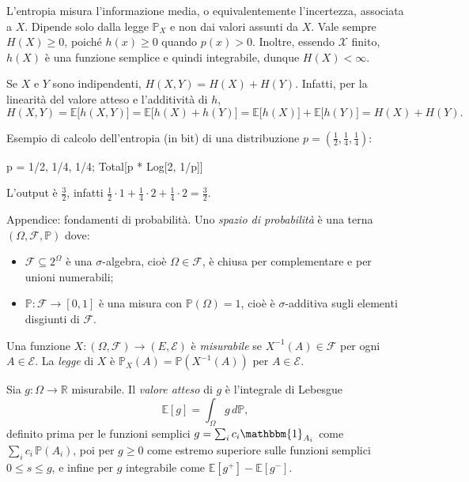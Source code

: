 \begin{rema}
L'entropia misura l'informazione media, o equivalentemente l'incertezza, associata a $X$. Dipende solo dalla legge $\mathbb{P}_X$ e non dai valori assunti da $X$. Vale sempre $H(X)\ge 0$, poiché $h(x)\ge 0$ quando $p(x)>0$. Inoltre, essendo $\mathcal{X}$ finito, $h(X)$ è una funzione semplice e quindi integrabile, dunque $H(X)<\infty$.
\end{rema}
\begin{rema}
Se $X$ e $Y$ sono indipendenti, $H(X,Y)=H(X)+H(Y)$. Infatti, per la linearità del valore atteso e l'additività di $h$,
\[
H(X,Y) = \mathbb{E}\big[h(X,Y)\big] = \mathbb{E}\big[h(X)+h(Y)\big] = \mathbb{E}\big[h(X)\big] + \mathbb{E}\big[h(Y)\big] = H(X) + H(Y).
\]
\end{rema}
\begin{rema}
Esempio di calcolo dell'entropia (in bit) di una distribuzione $p=(\tfrac12,\tfrac14,\tfrac14)$:
\begin{walfram}
p = {1/2, 1/4, 1/4};
Total[p * Log[2, 1/p]]
\end{walfram}
L'output è $\tfrac{3}{2}$, infatti $\tfrac12\cdot 1+\tfrac14\cdot 2+\tfrac14\cdot 2=\tfrac32$.
\end{rema}
\begin{defi}
Appendice: fondamenti di probabilità. Uno \textit{spazio di probabilità} è una terna $(\Omega,\mathcal{F},\mathbb{P})$ dove:
\begin{itemize}
\item $\mathcal{F}\subseteq 2^{\Omega}$ è una $\sigma$-algebra, cioè $\Omega\in\mathcal{F}$, è chiusa per complementare e per unioni numerabili;
\item $\mathbb{P}\colon\mathcal{F}\to[0,1]$ è una misura con $\mathbb{P}(\Omega)=1$, cioè è $\sigma$-additiva sugli elementi disgiunti di $\mathcal{F}$.
\end{itemize}
Una funzione $X\colon(\Omega,\mathcal{F})\to(E,\mathcal{E})$ è \textit{misurabile} se $X^{-1}(A)\in\mathcal{F}$ per ogni $A\in\mathcal{E}$. La \textit{legge} di $X$ è $\mathbb{P}_X(A)=\mathbb{P}(X^{-1}(A))$ per $A\in\mathcal{E}$.
\end{defi}
\begin{defi}
Sia $g\colon\Omega\to\mathbb{R}$ misurabile. Il \textit{valore atteso} di $g$ è l'integrale di Lebesgue
\[
\mathbb{E}[g] = \int_{\Omega} g\, d\mathbb{P},
\]
definito prima per le funzioni semplici $g=\sum_{i} c_i \mathbbm{1}_{A_i}$ come $\sum_i c_i\,\mathbb{P}(A_i)$, poi per $g\ge0$ come estremo superiore sulle funzioni semplici $0\le s\le g$, e infine per $g$ integrabile come $\mathbb{E}[g^+]-\mathbb{E}[g^-]$.
\end{defi}
